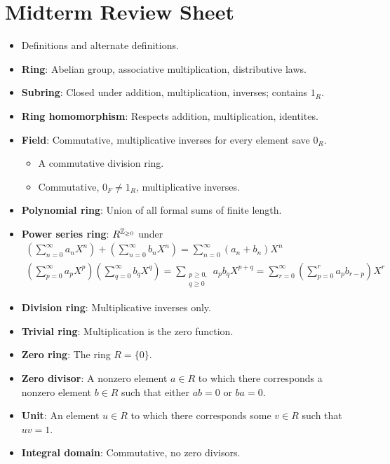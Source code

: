 \documentclass[../notes.tex]{subfiles}
\begin{document}
\section{Midterm Review Sheet}
\begin{itemize}
    \item {}Definitions and alternate definitions.
    \item \textbf{Ring}: Abelian group, associative multiplication, distributive laws.
    \item \textbf{Subring}: Closed under addition, multiplication, inverses; contains $1_R$.
    \item \textbf{Ring homomorphism}: Respects addition, multiplication, identites.
    \item \textbf{Field}: Commutative, multiplicative inverses for every element save $0_R$.
    \begin{itemize}
        \item A commutative division ring.
        \item Commutative, $0_F\neq 1_R$, multiplicative inverses.
    \end{itemize}
    \item \textbf{Polynomial ring}: Union of all formal sums of finite length.
    \item \textbf{Power series ring}: $R^{\mathbb{Z}_{\geq 0}}$ under
    \begin{gather*}
        \left( \sum_{n=0}^\infty a_nX^n \right)+\left( \sum_{n=0}^\infty b_nX^n \right) = \sum_{n=0}^\infty(a_n+b_n)X^n\\
        \left( \sum_{p=0}^\infty a_pX^p \right)\left( \sum_{q=0}^\infty b_qX^q \right) = \sum_{\substack{p\geq 0,\\ q\geq 0}}a_pb_qX^{p+q}
            = \sum_{r=0}^\infty\left( \sum_{p=0}^ra_pb_{r-p} \right)X^r
    \end{gather*}
    \item \textbf{Division ring}: Multiplicative inverses only.
    \item \textbf{Trivial ring}: Multiplication is the zero function.
    \item \textbf{Zero ring}: The ring $R=\{0\}$.
    \item \textbf{Zero divisor}: A nonzero element $a\in R$ to which there corresponds a nonzero element $b\in R$ such that either $ab=0$ or $ba=0$.
    \item \textbf{Unit}: An element $u\in R$ to which there corresponds some $v\in R$ such that $uv=1$.
    \item \textbf{Integral domain}: Commutative, no zero divisors.

\end{itemize}
\end{document}
